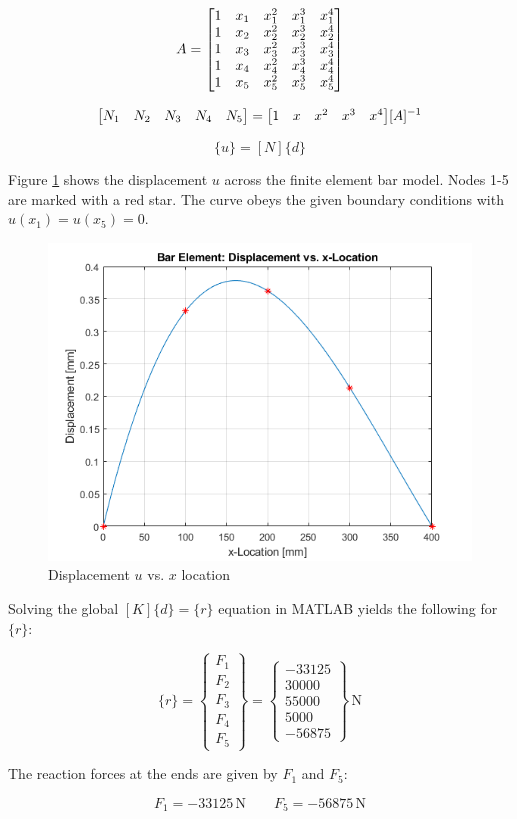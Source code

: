 \documentclass[../main.tex]{subfiles}
\begin{document}
\[
    A = \mqty[
        1 & x_1 & x_1^2 & x_1^3 & x_1^4\\
        1 & x_2 & x_2^2 & x_2^3 & x_2^4\\
        1 & x_3 & x_3^2 & x_3^3 & x_3^4\\
        1 & x_4 & x_4^2 & x_4^3 & x_4^4\\
        1 & x_5 & x_5^2 & x_5^3 & x_5^4\\
    ]
\]

\[
    \mqty[N_1 & N_2 & N_3 & N_4 & N_5] = \mqty[1 & x & x^2 & x^3 & x^4] [A]^{-1}
\]

\[
    \{u\} = [N]\{d\}
\]

Figure \ref{u_vs_x} shows the displacement \(u\) across the finite element bar model.
Nodes 1-5 are marked with a red star.
The curve obeys the given boundary conditions with \(u(x_1) = u(x_5) = 0\).

\begin{figure}[h!]
    \centering
    \includegraphics[scale=1]{../../images/problem_5/u_vs_x.png}
    \caption{Displacement \(u\) vs. \(x\) location}
    \label{u_vs_x}
\end{figure}

\newpage


Solving the global \([K]\{d\} = \{r\}\) equation in MATLAB yields the following for \(\{r\}\):

\[
    \{r\} =
    \begin{Bmatrix}
        F_1 \\ F_2 \\ F_3 \\ F_4 \\ F_5
    \end{Bmatrix}
    =
    \begin{Bmatrix}
        -33125 \\ 30000 \\ 55000 \\ 5000 \\ -56875
    \end{Bmatrix}   
    \, \unit{\newton}
\]

The reaction forces at the ends are given by \(F_1\) and \(F_5\):

\[
    \boxed{F_1 = -33125 \, \unit{\newton} \quad \quad F_5 = -56875 \, \unit{\newton}}
\]
\end{document}
